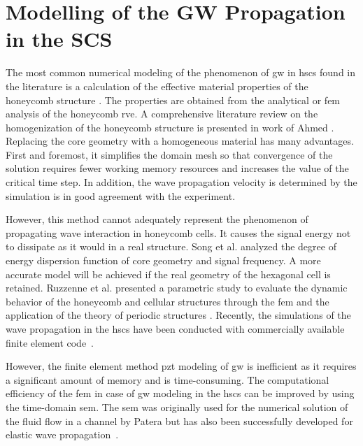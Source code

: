 \section{Modelling of the GW Propagation in the SCS}
\label{sec:modelling}



The most common numerical modeling of the phenomenon of \ac{gw} in \acp{hsc} found in the literature is a calculation of the effective material properties of the honeycomb structure \cite{baid2015dispersion, mustapha2014leaky, qi2008ultrasonic,  shi1995derivation, sikdar2016guided}.
The properties are obtained from the analytical \cite{gibson1982mechanics, malek2015effective} or \ac{fem} \cite{catapano2014multi, chen2014analysis} analysis of the honeycomb \ac{rve}.
A comprehensive literature review on the homogenization of the honeycomb structure is presented in work of Ahmed \cite{ahmed2019homogenization}.
Replacing the core geometry with a homogeneous material has many advantages.
First and foremost, it simplifies the domain mesh so that convergence of the solution requires fewer working memory resources and increases the value of the critical time step.
In addition, the wave propagation velocity is determined by the simulation is in good agreement with the experiment.

However, this method cannot adequately represent the phenomenon of propagating wave interaction in honeycomb cells.
It causes the signal energy not to dissipate as it would in a real structure.
Song et al. \cite{song2009guided} analyzed the degree of energy dispersion function of core geometry and signal frequency.
A more accurate model will be achieved if the real geometry of the hexagonal cell is retained.
Ruzzenne et al. presented a parametric study to evaluate the dynamic behavior of the honeycomb and cellular structures through the \ac{fem} and the application of the theory of periodic structures \cite{ruzzene2003wave}.
Recently, the simulations of the wave propagation in the \acp{hsc} have been conducted with commercially available finite element code~\cite{ hosseini2013numerical,song2009guided, tian2015wavenumber, zhao2018wave}.

However, the finite element method \ac{pzt} modeling of \ac{gw} is inefficient as it requires a significant amount of memory and is time-consuming.
The computational efficiency of the \ac{fem} in case of \ac{gw} modeling in the \acp{hsc} can be improved by using the time-domain \ac{sem}.
The \ac{sem} was originally used for the numerical solution of the fluid flow in a channel by Patera \cite{patera1984spectral} but has also been successfully developed for elastic wave propagation~\cite{ostachowicz2011guided}.

